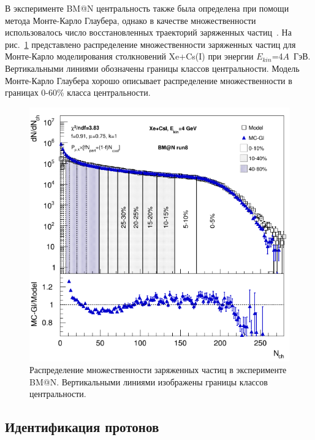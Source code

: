 В эксперименте BM@N центральность также была определена при помощи метода Монте-Карло Глаубера, однако в качестве множественности использовалось число восстановленных траекторий заряженных частиц~\cite{Segal:2023njv}.
На рис.~\ref{fig:bmn_multiplicity} представлено распределение множественности заряженных частиц для Монте-Карло моделирования столкновений Xe+Cs(I) при энергии $E_{kin}$=4$A$~ГэВ.
Вертикальными линиями обозначены границы классов центральности.
Модель Монте-Карло Глаубера хорошо описывает распределение множественности в границах 0-60\% класса центральности.
%
\begin{figure}[ht]
\begin{center}
\includegraphics[width=0.75\linewidth]{images/bmn_multiplicity.png}
\caption{Распределение множественности заряженных частиц в эксперименте BM@N. Вертикальными линиями изображены границы классов центральности.}
\label{fig:bmn_multiplicity}
\end{center}
\end{figure}

\subsection{Идентификация протонов}

